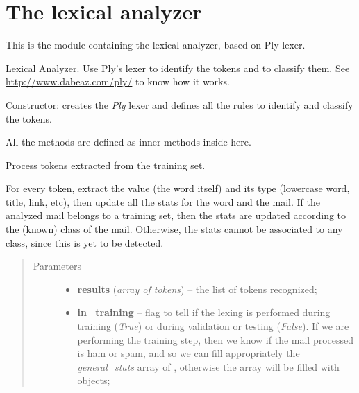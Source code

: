 \documentclass[letterpaper,10pt,english]{sphinxmanual}
\begin{document}
\section{The lexical analyzer}
\label{index:the-lexical-analyzer}
This is the module containing the lexical analyzer, based on Ply lexer.
\label{index:module-lexer}

\begin{fulllineitems}
\label{index:lexer.Lexer}
Lexical Analyzer. Use Ply's lexer to identify the tokens and to classify them.
See \href{http://www.dabeaz.com/ply/}{http://www.dabeaz.com/ply/} to know how it works.

\begin{fulllineitems}
\label{index:lexer.Lexer.__init__}
Constructor: creates the \emph{Ply} lexer and defines all the rules to identify
and classify the tokens.

All the  methods are defined as inner methods inside here.

\end{fulllineitems}


\begin{fulllineitems}
\label{index:lexer.Lexer._process_tokens}
Process tokens extracted from the training set.

For every token, extract the value (the word itself)
and its type (lowercase word, title, link, etc),
then update all the stats for the word and the mail.
If the analyzed mail belongs to a training set, then the stats
are updated according to the (known) class of the mail. Otherwise,
the stats cannot be associated to any class, since this is yet to
be detected.
\begin{quote}\begin{description}
\item[{Parameters}] \leavevmode\begin{itemize}
\item {} 
\textbf{results} (\emph{array of tokens}) -- the list of tokens recognized;

\item {} 
\textbf{in\_training} -- flag to tell if the lexing is performed during training            (\emph{True}) or during validation or testing (\emph{False}). If we are performing            the training step, then we know if the mail processed is ham or spam, and
so we can fill appropriately the \emph{general\_stats} array of
{\hyperref[index:gen_stat.Stat]{}}, otherwise the array will be filled with
{\hyperref[index:test_stat.Test_stat]{}} objects;


\end{itemize}
\end{description}
\end{quote}
\end{fulllineitems}
\end{fulllineitems}
\end{document}
